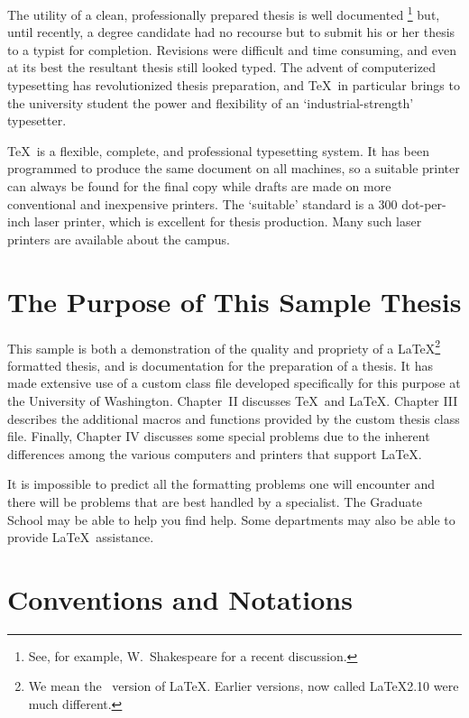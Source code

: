 \documentclass [11pt, twoside] {uwthesis}[2020/02/24]
\begin{document}
The utility of a clean, professionally prepared thesis is well
documented%
\footnote{See, for example,
  W.~Shakespeare\cite{Hamlet} for a recent discussion.}
but, until recently, a degree candidate had no recourse but
to submit his or her thesis to a typist for completion.
Revisions were difficult and time consuming, and even at its best the
resultant thesis still looked typed.
The advent of computerized typesetting has revolutionized
thesis preparation, and \TeX\ in particular brings to the
university student the power and flexibility of an
`industrial-strength' typesetter.
 
 
\TeX\ is a flexible,
complete, and professional typesetting system.
It has been programmed to produce
the same document on all machines, so
a suitable printer can always be found for the final copy
while drafts are made on more conventional and inexpensive printers.
The `suitable' standard is a 300 dot-per-inch laser printer,
which is excellent for thesis production.  Many such laser printers
are available about the campus.
 
\section{The Purpose of This Sample Thesis}
 
This sample is both a demonstration of the quality and
propriety of a \LaTeX\footnote{We mean the \LaTeXe\ version
of \LaTeX.  Earlier versions, now called \LaTeX2.10 were much
different.} formatted thesis, and is 
documentation for the preparation of a thesis.
It has made extensive use of a custom class file
developed specifically for this purpose
at the University of Washington.  Chapter~II discusses
\TeX\ and \LaTeX.
Chapter III describes the additional macros and functions
provided by the custom thesis class file.  Finally, Chapter IV discusses
some special problems due to the inherent differences among the various
computers and printers that support \LaTeX.
 
It is 
impossible to predict all the formatting problems one will encounter
and there will be problems that are best handled
by a specialist.  
The Graduate School may be able to help you find help.
Some departments may also be able to provide \LaTeX\ assistance.
 
 
\section{Conventions and Notations}
 
\end{document}
